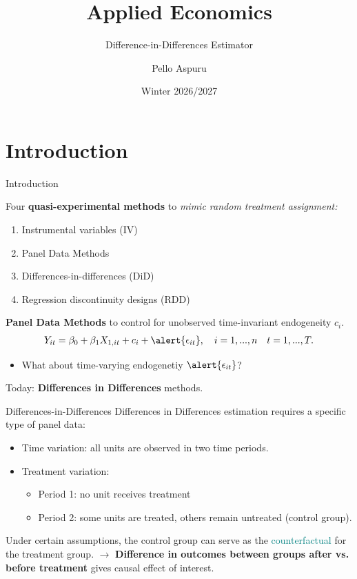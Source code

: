 \documentclass[9pt,aspectratio=169]{beamer}
\title{Applied Economics}
\subtitle{Difference-in-Differences Estimator}
\author{Pello Aspuru}
\date{Winter 2026/2027}
\begin{document}
{
  \begin{frame}
    \titlepage
  \end{frame}
}

\section{Introduction}

\begin{frame}{Introduction}
    
Four \color{teal}\textbf{quasi-experimental methods} \color{black}to \textit{mimic random treatment assignment:} 
\begin{enumerate}
    \item Instrumental variables (IV)
    \item Panel Data Methods
    \item Differences-in-differences (DiD)
    \item Regression discontinuity designs (RDD)
\end{enumerate}
\pause
\color{teal}\textbf{Panel Data Methods} \color{black} to control for unobserved time-invariant endogeneity $c_i$.
\begin{align*}
       Y_{it} = \beta_0 + \beta_1 X_{1,it} + c_i + \alert{\epsilon_{it}}, \quad i = 1, ... , n \quad t = 1, ... , T. 
\end{align*}
\vspace{-0.7cm}
\begin{itemize}
    \item[$\rightarrow$] What about time-varying endogenetiy $\alert{\epsilon_{it}}$?
\end{itemize} \pause
Today: \color{teal}\textbf{Differences in Differences} \color{black} methods.
\end{frame}

\begin{frame}{Differences-in-Differences}
Differences in Differences estimation requires a specific type of\alert{ panel data}:
\pause 
\begin{itemize}
    \item Time variation: all units are observed in two time periods. \pause
    \item Treatment variation: 
        \begin{itemize}
            \item Period 1: no unit receives treatment
            \item Period 2: some units are treated, others remain untreated (control group).
        \end{itemize}
\end{itemize}

Under certain assumptions, the control group can serve as the \textcolor{teal}{counterfactual} for the treatment group. $\rightarrow$ \textbf{Difference in outcomes between groups after vs. before treatment} gives causal effect of interest.
\end{frame}
\end{document}
